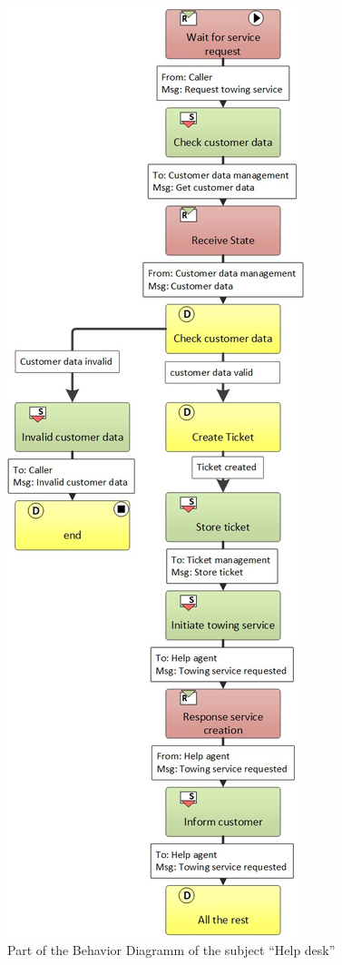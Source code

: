 \begin{figure}[htbp]
	\centering
	\includegraphics[width=0.7\linewidth]{Figures/Chapter5/figures-hierarchy/Car-Service-Lev9}
	\caption[Part of the Behavior Diagramm of the subject “Help desk”]{Part of the Behavior Diagramm of the subject “Help desk”}
	\label{fig:car-service-lev9}
\end{figure}


